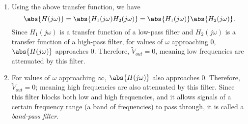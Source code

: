 \begin{enumerate}
{\begin{enumerate}
  \item Using the above transfer function, we have
     \[
      \abs{H(j \omega)} = \abs{H_1(j \omega)H_2(j \omega)}
      = \abs{H_1(j \omega)}\abs{H_2(j \omega)}
    .\]
    Since $H_1(j \omega)$ is a transfer function of a low-pass filter and $H_2(j \omega)$ is a transfer function of a high-pass filter, for values of $\omega$ approaching $0$, $\abs{H(j \omega)}$ approaches $0$.
    Therefore, $\widetilde{V}_{out} = 0$, meaning low frequencies are attenuated by this filter.

  \item For values of $\omega$ approaching $\infty$, $\abs{H(j \omega)}$ also approaches $0$.
    Therefore, $\widetilde{V}_{out} = 0$; meaning high frequencies are also attenuated by this filter. \vskip 1pt
    Since this filter blocks both low and high frequencies, and it allows signals of a certain frequency range (a band of frequencies) to pass through, it is called a \emph{band-pass filter}.

\end{enumerate}

}



\end{enumerate}

